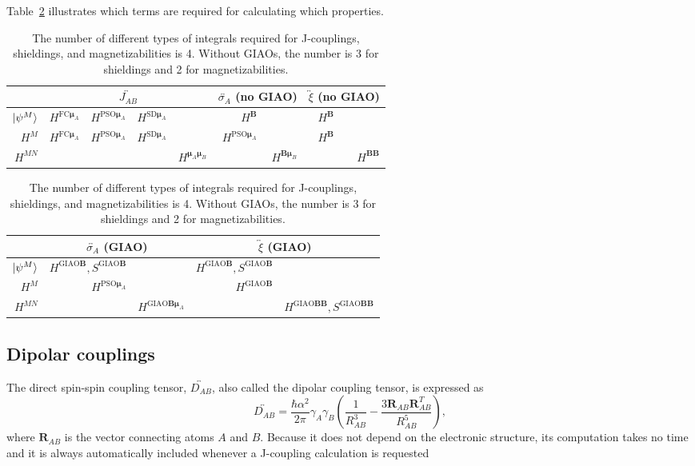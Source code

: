 Table~\ref{tab:magnetic_terms} illustrates which terms are required for calculating which properties.
\begin{table}[h]
  \caption{The number of different types of integrals required for J-couplings, shieldings, and magnetizabilities is 4. Without GIAOs, the number is 3 for shieldings and 2 for magnetizabilities.}
  \label{tab:magnetic_terms}
  \centering
  \begin{tabular}{r|rrrr|rr|rr}
    & \multicolumn{4}{c}{$\overleftrightarrow{J_{AB}}$} & \multicolumn{2}{c}{$\overleftrightarrow{\sigma_A}$ (no GIAO)} & \multicolumn{2}{c}{$\overleftrightarrow\xi$ (no GIAO)} \\
    \hline
    $\ket{\psi^M}$ & $H^{\text{FC}\bm\mu_A}$ & $H^{\text{PSO}\bm\mu_A}$ & $H^{\text{SD}\bm\mu_A}$ & & $H^{\bm B}$ & & $H^{\bm B}$ \\
    $H^M$ & $H^{\text{FC}\bm\mu_A}$ & $H^{\text{PSO}\bm\mu_A}$ & $H^{\text{SD}\bm\mu_A}$ & & $H^{\text{PSO}\bm\mu_A}$ & & $H^{\bm B}$\\
    $H^{MN}$ & & & & $H^{\bm\mu_A\bm\mu_B}$ & & $H^{\bm B\bm\mu_B}$ & & $H^{\bm B\bm B}$
  \end{tabular}
  \begin{tabular}{r|rr|rr}
    & \multicolumn{2}{c}{$\overleftrightarrow{\sigma_A}$ (GIAO)} & \multicolumn{2}{c}{$\overleftrightarrow\xi$ (GIAO)} \\
    \hline
    $\ket{\psi^M}$ & $H^{\text{GIAO}\bm B},S^{\text{GIAO}\bm B}$ & & $H^{\text{GIAO}\bm B},S^{\text{GIAO}\bm B}$ \\
    $H^M$ & $H^{\text{PSO}\bm\mu_A}$ & & $H^{\text{GIAO}\bm B}$ \\
    $H^{MN}$ & & $H^{\text{GIAO}\bm B\bm\mu_A}$ & & $H^{\text{GIAO}\bm B\bm B},S^{\text{GIAO}\bm B\bm B}$
  \end{tabular}
\end{table}

\subsection*{Dipolar couplings}

The direct spin-spin coupling tensor, $\overleftrightarrow{D_{AB}}$, also called the dipolar coupling tensor, is expressed as
\begin{equation}
   \overleftrightarrow{D_{AB}} = \frac{\hbar \alpha^2}{2\pi} \gamma_A\gamma_B \left( \frac{1}{R_{AB}^3} - \frac{3\bm R_{AB}\bm R_{AB}^T}{R_{AB}^5} \right),
\end{equation}
where $\bm R_{AB}$ is the vector connecting atoms $A$ and $B$. Because it does not depend on the electronic structure, its computation takes no time and it is always automatically included whenever a J-coupling calculation is requested


